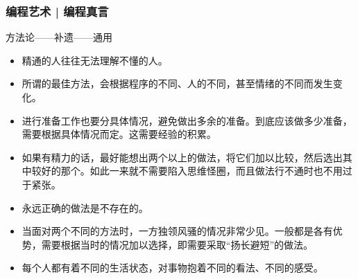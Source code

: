 \begin{frame}
  \frametitle{编程艺术 | 编程真言}
  \begin{block}{方法论——补遗——通用}
    \begin{itemize}
      \item 精通的人往往无法理解不懂的人。
      \item 所谓的\alert{最佳方法}，会根据程序的不同、人的不同，甚至情绪的不同而发生变化。
      \item 进行准备工作也要分具体情况，避免做出多余的准备。到底应该做多少准备，需要根据具体情况而定。这需要经验的积累。
      \item 如果有精力的话，最好能想出两个以上的做法，将它们加以比较，然后选出其中较好的那个。如此一来就不需要陷入思维怪圈，而且做法行不通时也不用过于紧张。
      \item 永远正确的做法是不存在的。
      \item 当面对两个不同的方法时，一方独领风骚的情况非常少见。一般都是各有优势，需要根据当时的情况加以选择，即需要采取“扬长避短”的做法。
      \item 每个人都有着不同的生活状态，对事物抱着不同的看法、不同的感受。

\end{itemize}
\end{block}
\end{frame}
